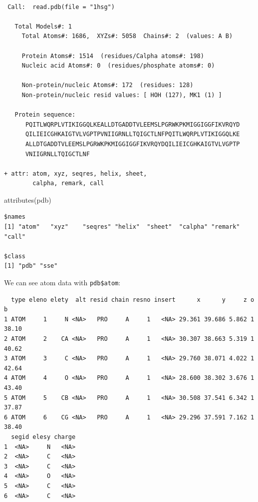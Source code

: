 \documentclass[
  letterpaper,
  DIV=11,
  numbers=noendperiod]{scrartcl}
\newenvironment{Shaded}{\begin{snugshade}}{\end{snugshade}}
\newcommand{\FunctionTok}[1]{\textcolor[rgb]{0.28,0.35,0.67}{#1}}
\newcommand{\NormalTok}[1]{\textcolor[rgb]{0.00,0.23,0.31}{#1}}
\newcommand{\SpecialCharTok}[1]{\textcolor[rgb]{0.37,0.37,0.37}{#1}}
\begin{document}
\begin{verbatim}

 Call:  read.pdb(file = "1hsg")

   Total Models#: 1
     Total Atoms#: 1686,  XYZs#: 5058  Chains#: 2  (values: A B)

     Protein Atoms#: 1514  (residues/Calpha atoms#: 198)
     Nucleic acid Atoms#: 0  (residues/phosphate atoms#: 0)

     Non-protein/nucleic Atoms#: 172  (residues: 128)
     Non-protein/nucleic resid values: [ HOH (127), MK1 (1) ]

   Protein sequence:
      PQITLWQRPLVTIKIGGQLKEALLDTGADDTVLEEMSLPGRWKPKMIGGIGGFIKVRQYD
      QILIEICGHKAIGTVLVGPTPVNIIGRNLLTQIGCTLNFPQITLWQRPLVTIKIGGQLKE
      ALLDTGADDTVLEEMSLPGRWKPKMIGGIGGFIKVRQYDQILIEICGHKAIGTVLVGPTP
      VNIIGRNLLTQIGCTLNF

+ attr: atom, xyz, seqres, helix, sheet,
        calpha, remark, call
\end{verbatim}

\begin{Shaded}
\begin{Highlighting}[]
\FunctionTok{attributes}\NormalTok{(pdb)}
\end{Highlighting}
\end{Shaded}

\begin{verbatim}
$names
[1] "atom"   "xyz"    "seqres" "helix"  "sheet"  "calpha" "remark" "call"  

$class
[1] "pdb" "sse"
\end{verbatim}

We can see atom data with \texttt{pdb\$atom}:

\begin{Shaded}
\end{Shaded}

\begin{verbatim}
  type eleno elety  alt resid chain resno insert      x      y     z o     b
1 ATOM     1     N <NA>   PRO     A     1   <NA> 29.361 39.686 5.862 1 38.10
2 ATOM     2    CA <NA>   PRO     A     1   <NA> 30.307 38.663 5.319 1 40.62
3 ATOM     3     C <NA>   PRO     A     1   <NA> 29.760 38.071 4.022 1 42.64
4 ATOM     4     O <NA>   PRO     A     1   <NA> 28.600 38.302 3.676 1 43.40
5 ATOM     5    CB <NA>   PRO     A     1   <NA> 30.508 37.541 6.342 1 37.87
6 ATOM     6    CG <NA>   PRO     A     1   <NA> 29.296 37.591 7.162 1 38.40
  segid elesy charge
1  <NA>     N   <NA>
2  <NA>     C   <NA>
3  <NA>     C   <NA>
4  <NA>     O   <NA>
5  <NA>     C   <NA>
6  <NA>     C   <NA>
\end{verbatim}
\end{document}

